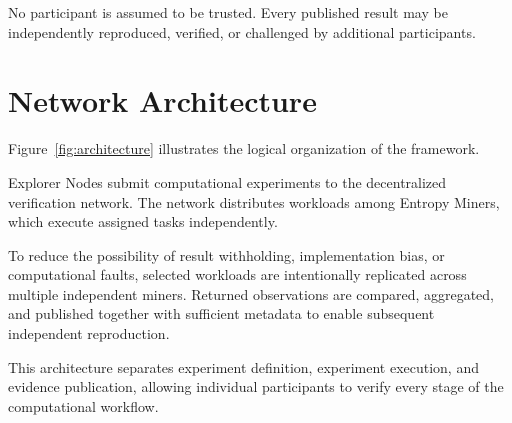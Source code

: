 \documentclass[11pt]{article}
\begin{document}
No participant is assumed to be trusted.
Every published result may be independently reproduced,
verified,
or challenged by additional participants.


\section{Network Architecture}

Figure~\ref{fig:architecture}
illustrates the logical organization of the framework.

Explorer Nodes submit computational experiments
to the decentralized verification network.
The network distributes workloads among
Entropy Miners,
which execute assigned tasks independently.

To reduce the possibility of result withholding,
implementation bias,
or computational faults,
selected workloads are intentionally replicated
across multiple independent miners.
Returned observations are compared,
aggregated,
and published together with sufficient metadata
to enable subsequent independent reproduction.

This architecture separates
experiment definition,
experiment execution,
and evidence publication,
allowing individual participants
to verify every stage of the computational workflow.

\end{document}
